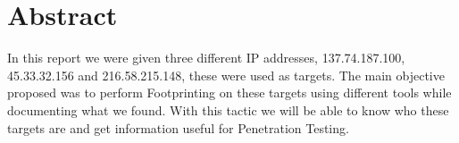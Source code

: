 \section{Abstract}

In this report we were given three different IP addresses, 137.74.187.100, 45.33.32.156 and 216.58.215.148, these were used as targets. The main objective proposed was to perform Footprinting on these targets using different tools while documenting what we found. With this tactic we will be able to know who these targets are and get information useful for Penetration Testing.

\pagebreak